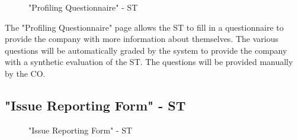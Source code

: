 \begin{figure}[H]
    \centering
    \caption{"Profiling Questionnaire" - ST}
    \label{fig:profiling-questionnaire-st}
\end{figure}

\par The "Profiling Questionnaire" page allows the ST to fill in a questionnaire to provide the company with more
information about themselves. The various questions will be automatically graded by the system to provide the
company with a synthetic evaluation of the ST. The questions will be provided manually by the CO.

\subsection{"Issue Reporting Form" - ST}
\label{subsec:issue-reporting-form-st}%

\begin{figure}[H]
    \centering
    \caption{"Issue Reporting Form" - ST}
    \label{fig:issue-reporting-form-st}
\end{figure}

